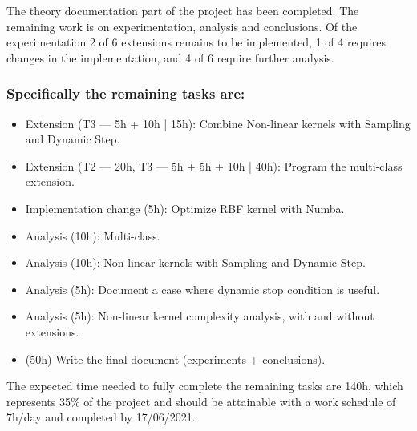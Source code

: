 The theory documentation part of the project has been completed. The remaining work is on experimentation, analysis and conclusions. Of the experimentation 2 of 6 extensions remains to be implemented, 1 of 4 requires changes in the im\-ple\-men\-ta\-tion, and 4 of 6 require further analysis.

\subsubsection*{Specifically the remaining tasks are:}

\begin{itemize}
    \item Extension (T3 — 5h + 10h | 15h): Combine Non-linear kernels with Sampling and Dynamic Step.
    \item Extension (T2 — 20h, T3 — 5h + 5h + 10h | 40h): Program the multi-class extension.
    \item Implementation change (5h): Optimize RBF kernel with Numba.
    \item Analysis (10h): Multi-class.
    \item Analysis (10h): Non-linear kernels with Sampling and Dynamic Step.
    \item Analysis (5h): Document a case where dynamic stop condition is useful.
    \item Analysis (5h): Non-linear kernel complexity analysis, with and without extensions.
    \item (50h) Write the final document (experiments + conclusions).
\end{itemize}

The expected time needed to fully complete the remaining tasks are 140h, which represents 35\% of the project and should be attainable with a work schedule of 7h/day and completed by 17/06/2021.

